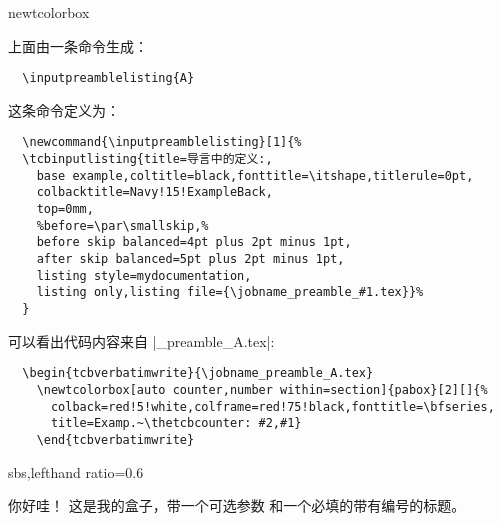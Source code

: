 \begin{docCommand}{newtcolorbox}{}
\begin{tcolorbox}[breakable, title=译者对上面这个盒子的分析]
  上面由一条命令生成：

  \begin{verbatim}
  \inputpreamblelisting{A}
  \end{verbatim}

  \tcbline  

  这条命令定义为：
  \begin{verbatim}
  \newcommand{\inputpreamblelisting}[1]{%
  \tcbinputlisting{title=导言中的定义:,
    base example,coltitle=black,fonttitle=\itshape,titlerule=0pt,
    colbacktitle=Navy!15!ExampleBack,
    top=0mm,
    %before=\par\smallskip,%
    before skip balanced=4pt plus 2pt minus 1pt,
    after skip balanced=5pt plus 2pt minus 1pt,
    listing style=mydocumentation,
    listing only,listing file={\jobname_preamble_#1.tex}}%
  }
  \end{verbatim}

  \tcbline  

  可以看出代码内容来自 |\jobname_preamble_A.tex|\footnotemark:
  \begin{verbatim}
  \begin{tcbverbatimwrite}{\jobname_preamble_A.tex}
    \newtcolorbox[auto counter,number within=section]{pabox}[2][]{%
      colback=red!5!white,colframe=red!75!black,fonttitle=\bfseries,
      title=Examp.~\thetcbcounter: #2,#1}
    \end{tcbverbatimwrite}
  \end{verbatim}
\end{tcolorbox}

\begin{dispExample*}{sbs,lefthand ratio=0.6}
\begin{pabox}[colback=yellow]{你好哇！}
这是我的盒子，带一个可选参数%
和一个必填的带有编号的标题。
\end{pabox}
\end{dispExample*}
\end{docCommand}


